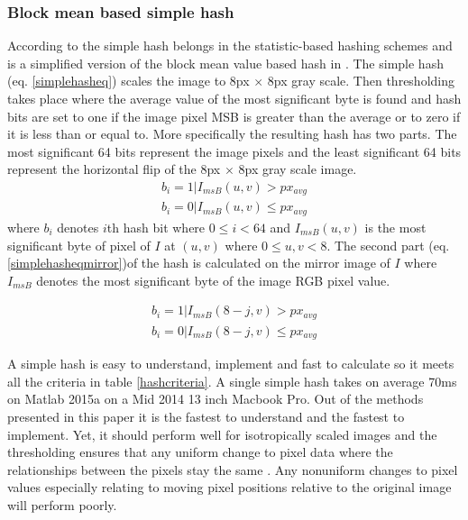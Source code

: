 \documentclass[english,12pt,a4paper,pdftex,elec,utf8, table]{aaltothesis}
\begin{document}
\subsubsection{Block mean based simple hash}\label{simplehash}
According to \cite[p. 20]{Hadmi2012} the simple hash belongs in the statistic-based hashing schemes and is a simplified version of the block mean value based hash in \cite{Yang2006}. The simple hash (eq. \ref{simplehasheq}) scales the image to 8px $\times$ 8px gray scale. Then thresholding takes place where the average value of the most significant byte is found and hash bits are set to one if the image pixel MSB is greater than the average or to zero if it is less than or equal to. More specifically the resulting hash has two parts. The most significant 64 bits represent the image pixels and the least significant 64 bits represent the horizontal flip of the 8px $\times$ 8px gray scale image.
\begin{equation} \label{simplehasheq}
  \begin{split}
  b_{i} = 1 | I_{msB}(u,v) > px_{avg}\\
  b_{i} = 0 | I_{msB}(u,v) \leq px_{avg}
  \end{split}
\end{equation}
where $b_{i}$ denotes $i$th hash bit where $0 \leq i < 64$ and $I_{msB}(u,v)$ is the most significant byte of pixel of $I$ at $(u,v)$ where $0 \leq u,v < 8$. The second part (eq. \ref{simplehasheqmirror})of the hash is calculated on the mirror image of $I$ where $I_{msB}$ denotes the most significant byte of the image RGB pixel value.

\begin{equation} \label{simplehasheqmirror}
  \begin{split}
  b_{i} = 1 | I_{msB}(8-j,v) > px_{avg}\\
  b_{i} = 0 | I_{msB}(8-j,v) \leq px_{avg}
  \end{split}
\end{equation}

A simple hash is easy to understand, implement and fast to calculate so it meets all the criteria in table \ref{hashcriteria}. A single simple hash takes on average 70ms on Matlab 2015a on a Mid 2014 13 inch Macbook Pro. Out of the methods presented in this paper it is the fastest to understand and the fastest to implement. Yet, it should perform well for isotropically scaled images and the thresholding ensures that any uniform change to pixel data where the relationships between the pixels stay the same \cite{Zauner2010}. Any nonuniform changes to pixel values especially relating to moving pixel positions relative to the original image will perform poorly.
\end{document}
